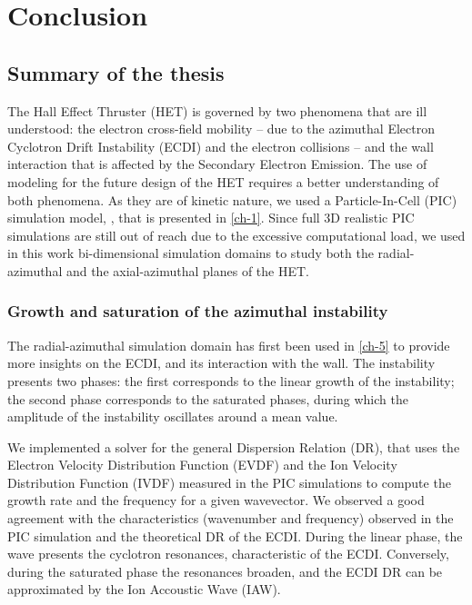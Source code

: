 
\chapter{Conclusion}
\label{ch-conclusion}

\section{Summary of the thesis}

  The Hall Effect Thruster (HET) is governed by two phenomena that are ill understood\string: the electron cross-field mobility -- due to the azimuthal Electron Cyclotron Drift Instability (ECDI) and the electron collisions -- and the wall interaction that is affected by the Secondary Electron Emission.
  The use of modeling for the future design  of the HET requires a better understanding of both phenomena. 
  As they are of kinetic nature, we used a Particle-In-Cell (PIC) simulation model, \LPPic, that is presented in \cref{ch-1}.
  Since full 3D realistic PIC simulations are still out of reach due to the excessive computational load, we used in this work bi-dimensional simulation domains to study both the radial-azimuthal and the axial-azimuthal planes of the HET.

  \subsection{Growth and saturation of the azimuthal instability}

    The radial-azimuthal simulation domain has first been used in \cref{ch-5} to provide more insights on the \ac{ECDI}, and its interaction with the wall.
    The instability presents two phases\string: the first corresponds to the linear growth of the instability; the second phase corresponds to the saturated phases, during which the amplitude of the instability oscillates around a mean value.

    We implemented a solver for the general Dispersion Relation (DR), that uses the Electron Velocity Distribution Function (EVDF) and the Ion Velocity Distribution Function (IVDF) measured in the PIC simulations to compute the growth rate and the frequency for a given wavevector.
    We observed a good agreement with the characteristics (wavenumber and frequency) observed in the \ac{PIC} simulation and the theoretical DR of the ECDI.
    During the linear phase, the wave presents the cyclotron resonances, characteristic of the ECDI.
    Conversely, during the saturated phase the resonances broaden, and the ECDI DR can be approximated by the Ion Accoustic Wave (IAW).


